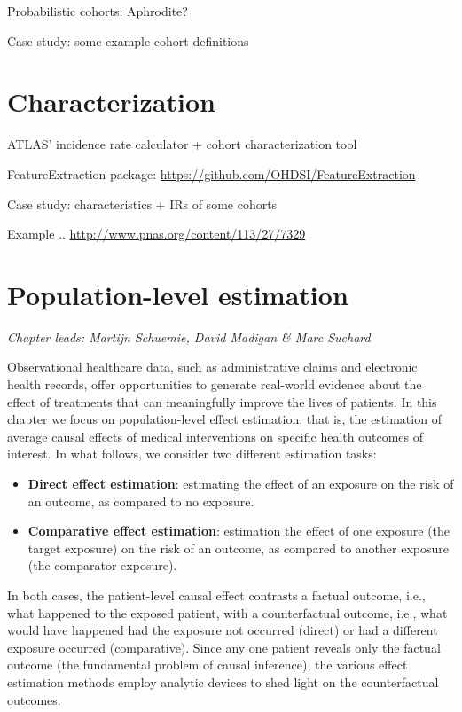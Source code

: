 \documentclass[]{book}
\providecommand{\tightlist}{%
  \setlength{\itemsep}{0pt}\setlength{\parskip}{0pt}}
\begin{document}
Probabilistic cohorts: Aphrodite?

Case study: some example cohort definitions

\chapter{Characterization}\label{Characterization}

ATLAS' incidence rate calculator + cohort characterization tool

FeatureExtraction package:
\url{https://github.com/OHDSI/FeatureExtraction}

Case study: characteristics + IRs of some cohorts

Example .. \url{http://www.pnas.org/content/113/27/7329}

\chapter{Population-level estimation}\label{PopulationLevelEstimation}

\emph{Chapter leads: Martijn Schuemie, David Madigan \& Marc Suchard}

Observational healthcare data, such as administrative claims and
electronic health records, offer opportunities to generate real-world
evidence about the effect of treatments that can meaningfully improve
the lives of patients. In this chapter we focus on population-level
effect estimation, that is, the estimation of average causal effects of
medical interventions on specific health outcomes of interest. In what
follows, we consider two different estimation tasks:

\begin{itemize}
\tightlist
\item
  \textbf{Direct effect estimation}: estimating the effect of an
  exposure on the risk of an outcome, as compared to no exposure.
\item
  \textbf{Comparative effect estimation}: estimation the effect of one
  exposure (the target exposure) on the risk of an outcome, as compared
  to another exposure (the comparator exposure).
\end{itemize}

In both cases, the patient-level causal effect contrasts a factual
outcome, i.e., what happened to the exposed patient, with a
counterfactual outcome, i.e., what would have happened had the exposure
not occurred (direct) or had a different exposure occurred
(comparative). Since any one patient reveals only the factual outcome
(the fundamental problem of causal inference), the various effect
estimation methods employ analytic devices to shed light on the
counterfactual outcomes.
\end{document}
